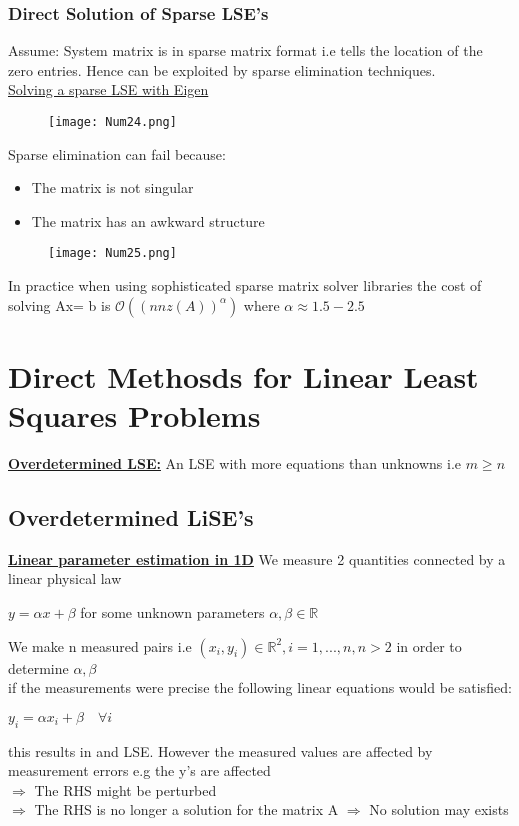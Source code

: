 \documentclass[8pt]{extreport}
\begin{document}
\subsection{Direct Solution of Sparse LSE's}

Assume: System matrix is in sparse matrix format i.e tells the location of the zero entries. Hence can be exploited by sparse elimination techniques.\\
\underline{Solving a sparse LSE with Eigen}
\begin{figure}[H]
\centering
\texttt{[image: Num24.png]}
\end{figure}
Sparse elimination can fail because:
\begin{itemize}
\item The matrix is not singular
\item The matrix has an awkward structure
\end{itemize}

\begin{figure}[H]
\centering
\texttt{[image: Num25.png]}
\end{figure}


In practice when using sophisticated sparse matrix solver libraries the cost of solving Ax= b is $\mathcal{O}((nnz(A))^{\alpha})$ where $\alpha \approx 1.5 - 2.5$


\chapter{Direct Methosds for Linear Least Squares Problems}

\underline{\textbf{Overdetermined LSE:}} An LSE with more equations than unknowns i.e $m \geq n$

\section{Overdetermined LiSE's}

\underline{\textbf{Linear parameter estimation in 1D}} We measure 2 quantities connected by a linear physical law
\begin{center}
$y = \alpha x + \beta$ for some unknown parameters $\alpha,\beta \in \mathbb{R}$
\end{center}
We make n measured pairs i.e $(x_i,y_i) \in \mathbb{R}^2, i = 1,...,n, n>2$ in order to determine $\alpha, \beta$\\
if the measurements were precise the following linear equations would be satisfied:
\begin{center}
$y_i = \alpha x_i + \beta \quad \forall i$
\end{center}
this results in and LSE. However the measured values are affected by measurement errors e.g the y's are affected\\
$\Rightarrow$ The RHS might be perturbed \\
$\Rightarrow$ The RHS is no longer a solution for the matrix A
$\Rightarrow$ No solution may exists
\end{document}
